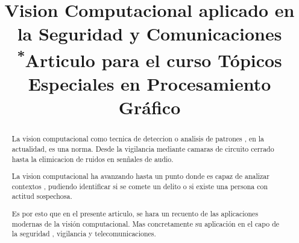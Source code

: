 \documentclass[conference]{IEEEtran}
\begin{document}
\title{Vision Computacional aplicado en la Seguridad y Comunicaciones\\
{\footnotesize \textsuperscript{*}Articulo para el curso Tópicos Especiales en Procesamiento Gráfico}
}

\author{
\and
{}
\and
{}
\and
{}
}

\maketitle

\begin{abstract}
La vision computacional como tecnica de deteccion o analisis de patrones , en la actualidad, es una norma. Desde la vigilancia mediante
camaras de circuito cerrado hasta la elimicacion de ruidos en sen\~nales de audio.

La vision computacional ha avanzando hasta un punto donde es capaz de analizar contextos , pudiendo identificar si se comete un delito o
si existe una persona con actitud sospechosa.

Es por esto que en el presente articulo, se hara un recuento de las aplicaciones modernas de la visión computacional. Mas concretamente su
aplicación en el capo de la seguridad , vigilancia y telecomunicaciones.

\end{abstract}
\end{document}

